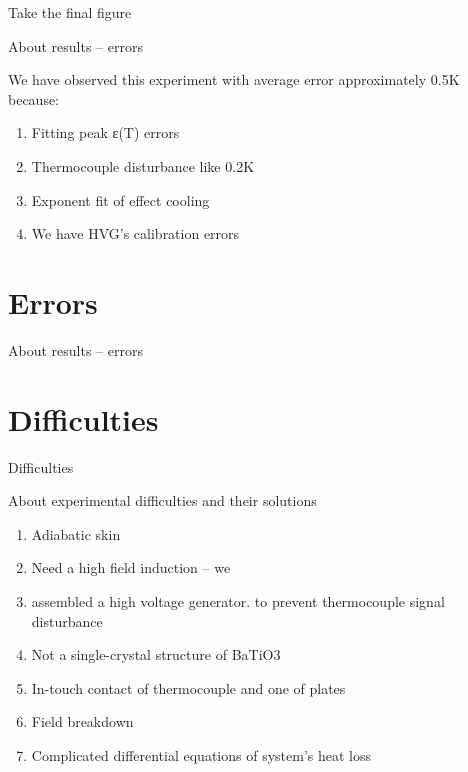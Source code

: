 \documentclass [xcolor=svgnames, t] {beamer}
\begin{document}
\begin{frame}{Take the final figure
}
\end{frame}

\begin{frame}{About results – errors
}
\vspace{1,2 cm}
\begin{block}{We have observed this experiment with average error approximately 0.5K because:}
 \begin{enumerate}
     \item Fitting peak ε(T) errors
\item Thermocouple disturbance like 0.2K
\item Exponent fit of effect cooling
\item We have HVG’s calibration errors

 \end{enumerate}  
 \end{block}
\end{frame}
\section{Errors}
\begin{frame}{About results – errors
}
\end{frame}

\section{Difficulties}
\begin{frame}{Difficulties}
    \begin{block}{About experimental difficulties and their solutions
}
        \begin{enumerate}
            \item Adiabatic skin
\item Need a high field induction – we \item assembled a high voltage generator.
\itemNeed to prevent thermocouple signal disturbance
\item Not a single-crystal structure of BaTiO3
\item In-touch contact of thermocouple and one of plates
\item Field breakdown
\item Complicated differential equations of system’s heat loss 

        \end{enumerate}
    \end{block}
\end{frame}
\end{document}
